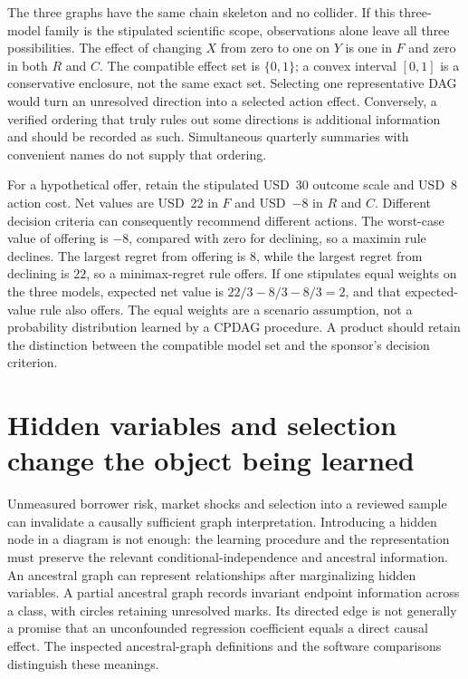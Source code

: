 The three graphs have the same chain skeleton and no collider. If this
three-model family is the stipulated scientific scope, observations alone
leave all three possibilities. The effect of changing $X$ from zero to one
on $Y$ is one in $F$ and zero in both $R$ and $C$. The compatible effect set
is $\{0,1\}$; a convex interval $[0,1]$ is a conservative enclosure, not the
same exact set. Selecting one representative DAG would turn an unresolved
direction into a selected action effect. Conversely, a verified ordering
that truly rules out some directions is additional information and should
be recorded as such. Simultaneous quarterly summaries with convenient names
do not supply that ordering. \citep{exec16_s2_exact}

For a hypothetical offer, retain the stipulated USD~30 outcome scale and
USD~8 action cost. Net values are USD~22 in $F$ and USD~$-8$ in $R$ and $C$.
Different decision criteria can consequently recommend different actions.
The worst-case value of offering is $-8$, compared with zero for declining,
so a maximin rule declines. The largest regret from offering is $8$, while
the largest regret from declining is $22$, so a minimax-regret rule offers.
If one stipulates equal weights on the three models, expected net value is
$22/3-8/3-8/3=2$, and that expected-value rule also offers. The equal weights
are a scenario assumption, not a probability distribution learned by a CPDAG
procedure. A product should retain the distinction between the compatible
model set and the sponsor's decision criterion. \citep{exec16_s2_exact}

\section{Hidden variables and selection change the object being learned}

Unmeasured borrower risk, market shocks and selection into a reviewed sample
can invalidate a causally sufficient graph interpretation. Introducing a
hidden node in a diagram is not enough: the learning procedure and the
representation must preserve the relevant conditional-independence and
ancestral information. An ancestral graph can represent relationships after
marginalizing hidden variables. A partial ancestral graph records invariant
endpoint information across a class, with circles retaining unresolved marks.
Its directed edge is not generally a promise that an unconfounded regression
coefficient equals a direct causal effect. The inspected ancestral-graph
definitions and the software comparisons distinguish these meanings.
\citep{zhang2008,exec13_latentr_primary}

